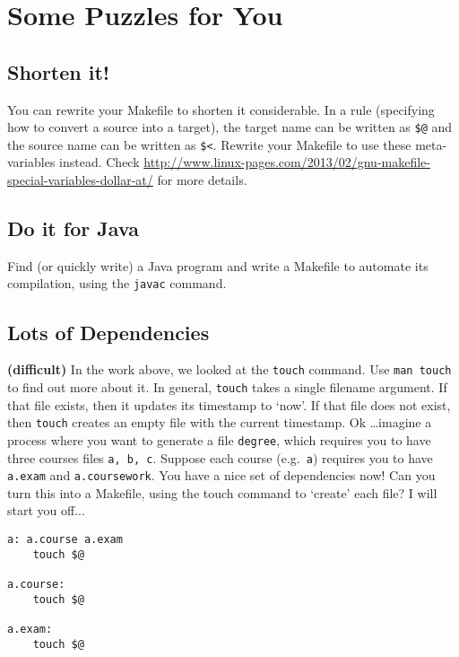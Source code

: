 \documentclass{article}
\begin{document}
\section*{Some Puzzles for You}

\subsection{Shorten it!}
You can rewrite your Makefile to shorten it considerable. In a rule (specifying how to convert a source into a target), the target name can be written as \verb+$@+ and the source name can be written as \verb+$<+. Rewrite your Makefile to use these meta-variables instead. Check \url{http://www.linux-pages.com/2013/02/gnu-makefile-special-variables-dollar-at/} for more details.

\subsection{Do it for Java}
Find (or quickly write) a Java program and write a Makefile to automate its compilation, using the \texttt{javac} command.

\subsection{Lots of Dependencies}
\textbf{(difficult)} In the work above, we looked at the \texttt{touch} command. Use \texttt{man touch} to find out more about it. In general, \texttt{touch} takes a single filename argument. If that file exists, then it updates its timestamp to `now'. If that file does not exist, then \texttt{touch} creates an empty file with the current timestamp. Ok \ldots imagine a process where you want to generate a file \texttt{degree}, which requires you to have three courses files \texttt{a, b, c}. Suppose each course (e.g.\ \texttt{a}) requires you to have \texttt{a.exam} and \texttt{a.coursework}. You have a nice set of dependencies now!  Can you turn this into a Makefile, using the touch command to `create' each file? I will start you off...


\begin{lstlisting}[style=MakeProg]
a: a.course a.exam
    touch $@

a.course:
    touch $@

a.exam:
    touch $@

\end{lstlisting}
\end{document}
